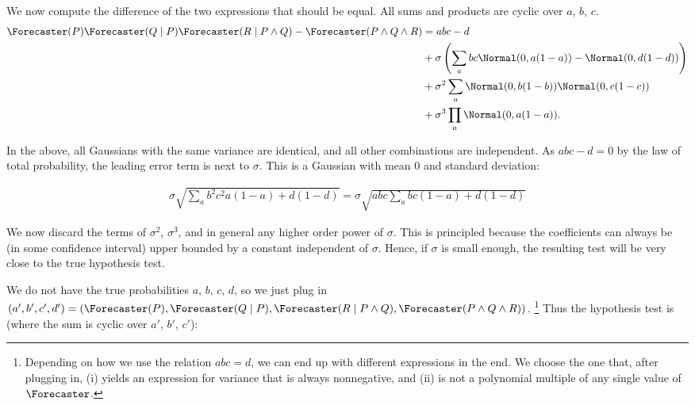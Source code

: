 We now compute the difference of the two expressions that should be equal.
All sums and products are cyclic over $a$, $b$, $c$.
\begin{align*}
    \Forecaster(P) \Forecaster(Q \mid P) \Forecaster(R \mid P \wedge Q) - \Forecaster(P \wedge Q \wedge R)
    &= abc - d \\
    &+ \sigma \left( \sum_{a} bc \Normal(0, a(1-a)) - \Normal(0, d(1-d))\right) \\
    &+ \sigma^2 \sum_{a} \Normal(0, b(1-b)) \Normal(0, c(1-c)) \\
    &+ \sigma^3 \prod_{a} \Normal(0, a(1-a)).
\end{align*}

In the above, all Gaussians with the same variance are identical, and all other combinations are independent.
As $abc - d = 0$ by the law of total probability, the leading error term is next to $\sigma$.
This is a Gaussian with mean 0 and standard deviation:

\begin{align*}
    \sigma \sqrt{\sum_{a} b^2c^2 a(1-a) + d(1-d)}
    =
    \sigma \sqrt{abc \sum_{a} bc (1-a) + d(1-d)}
\end{align*}



We now discard the terms of $\sigma^2$, $\sigma^3$, and in general any higher order power of $\sigma$. This is principled because the coefficients can always be (in some confidence interval) upper bounded by a constant independent of $\sigma$.
Hence, if $\sigma$ is small enough, the resulting test will be very close to the true hypothesis test.



We do not have the true probabilities $a$, $b$, $c$, $d$, so we just plug in $(a', b', c', d') = (\Forecaster(P), \Forecaster(Q \mid P), \Forecaster(R \mid P \wedge Q), \Forecaster(P \wedge Q \wedge R))$. \footnote{Depending on how we use the relation $abc=d$, we can end up with different expressions in the end. We choose the one that, after plugging in, (i) yields an expression for variance that is always nonnegative, and (ii) is not a polynomial multiple of any single value of $\Forecaster$.}
 Thus the hypothesis test is (where the sum is cyclic over $a'$, $b'$, $c'$):

